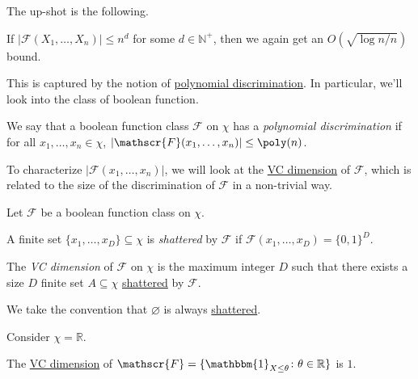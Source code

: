 The up-shot is the following.

\begin{remark}
	If \(\vert \mathscr{F} (X_1, \dots , X_n) \vert \leq n^d\) for some \(d\in \mathbb{N}^+ \), then we again get an \(O(\sqrt{\log n / n} )\) bound.
\end{remark}

This is captured by the notion of \hyperref[def:polynomial-discrimination]{polynomial discrimination}. In particular, we'll look into the class of boolean function.

\begin{definition}\label{def:polynomial-discrimination}
	We say that a boolean function class \(\mathscr{F} \) on \(\chi \) has a \emph{polynomial discrimination} if for all \(x_1, \dots , x_n\in \chi \), \(\left\vert \mathscr{F} (x_1, \dots , x_n) \right\vert \leq \poly(n)\).
\end{definition}

To characterize \(\vert \mathscr{F} (x_1, \dots , x_n) \vert \), we will look at the \hyperref[def:VC-dimension]{VC dimension} of \(\mathscr{F} \), which is related to the size of the discrimination of \(\mathscr{F} \) in a non-trivial way.

\begin{definition*}
	Let \(\mathscr{F} \) be a boolean function class on \(\chi \).
	\begin{definition}[Shatter]\label{def:shatter}
		A finite set \(\{ x_1, \dots , x_D \} \subseteq \chi \) is \emph{shattered} by \(\mathscr{F} \) if \(\mathscr{F} (x_1, \dots , x_D) = \{ 0, 1 \} ^D\).
	\end{definition}

	\begin{definition}[VC dimension]\label{def:VC-dimension}
		The \emph{VC dimension} of \(\mathscr{F} \) on \(\chi \) is the maximum integer \(D\) such that there exists a size \(D\) finite set \(A \subseteq \chi \) \hyperref[def:shatter]{shattered} by \(\mathscr{F} \).
	\end{definition}
\end{definition*}


\begin{remark}
	We take the convention that \(\varnothing \) is always \hyperref[def:shatter]{shattered}.
\end{remark}

Consider \(\chi = \mathbb{R} \).

\begin{eg}
	The \hyperref[def:VC-dimension]{VC dimension} of \(\mathscr{F} = \{ \mathbbm{1}_{X \leq \theta } \colon \theta \in \mathbb{R} \} \) is \(1\).
\end{eg}

